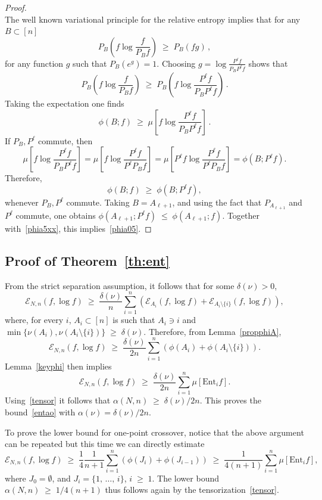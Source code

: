 \documentclass[AHL,Unicode,longabstracts,published]{cedram}
\renewcommand{\leq}{\;\leqslant\;}
\renewcommand{\geq}{\;\geqslant\;}
\newcommand{\ent}{\mathrm{Ent}}
\newcommand{\cE}{\mathcal{E}}
\let\a=\alpha
\let\d=\delta
\begin{document}
\begin{proof}
\begin{equation}
\end{equation}
The well known variational principle for the relative entropy implies that for any $B\subset [n]$
\[
P_B\left(f\log\frac{f}{P_Bf}\right)\geq P_B(fg)\,,
\]
for any function $g$ such that $P_B(e^g)=1$. Choosing $g= \log\frac{P^\ell f}{P_BP^\ell f}$ shows that
\[
P_B\left(f\log\frac{f}{P_Bf}\right)\geq P_B\left(f\log\frac{P^\ell f}{P_BP^\ell f}\right)\,.
\]
Taking the expectation one finds
\[
\phi(B;f)\geq\mu\left[f\log\frac{P^\ell f}{P_BP^\ell f}
\right]\,.
\]
If $P_B,P^\ell $ commute, then
\[
\mu\left[f\log\frac{P^\ell f}{P_BP^\ell f}
\right]= \mu\left[f\log\frac{P^\ell f}{P^\ell P_Bf}
\right]=\mu\left[P^\ell f\log\frac{P^\ell f}{P^\ell P_Bf}
\right] = \phi\left(B;P^\ell f\right).
\]
Therefore,
\[
\phi(B;f)\geq\phi\left(B;P^\ell f\right),
\]
whenever $P_B,P^\ell $ commute. Taking $B=A_{\ell+1}$, and using the fact that $P_{A_{\ell+1}}$ and $P^{\ell}$ commute, one obtains $\phi\left(A_{\ell+1};P^\ell f\right)\leq \phi\left(A_{\ell+1}; f\right)$. Together with~\eqref{phia5xx}, this implies~\eqref{phia05}.
\end{proof}


\subsection{Proof of Theorem~\ref{th:ent}}

From the strict separation assumption, it follows that for some $\d(\nu)>0$,
\[
\cE_{N,n}(f,\log f)
\geq \frac{\d(\nu)}n\sum_{i=1}^n\left(\cE_{A_i}(f,\log f)+\cE_{A_i\setminus\{i\}}(f,\log f)\right),
\]
where, for every $i$, $A_i\subset[n]$ is such that $A_i\ni i$ and $\min\{\nu(A_i),\nu(A_i\setminus\{i\})\}\geq \d(\nu)$. Therefore, from Lemma~\ref{propphiA},
\begin{equation}\label{phia5a1}
\cE_{N,n}(f,\log f)
\geq \frac{\d(\nu)}{2n}\sum_{i=1}^n\left(\phi(A_i) +\phi(A_i\setminus\{i\})\right).
\end{equation}
Lemma~\ref{keyphi} then implies
\begin{equation}\label{phia5a2}
\cE_{N,n}(f,\log f)
\geq \frac{\d(\nu)}{2n}\sum_{i=1}^n\mu\left[\ent_i f\right].
\end{equation}
Using~\eqref{tensor} it follows that $\a(N,n)\geq \d(\nu)/{2n}$. This proves the bound~\eqref{entao} with $\a(\nu)=\d(\nu)/{2n}$.

To prove the lower bound for one-point crossover, notice that the above argument can be repeated but this time we can directly estimate
\[
\cE_{N,n}(f,\log f)\geq \frac14\frac1{n+1}\sum_{i=1}^n (\phi(J_i)+\phi(J_{i-1}))\geq
\frac1{4(n+1)}\sum_{i=1}^n\mu\left[\ent_{i}f \right],
\]
where $J_0=\emptyset$, and $J_i=\{1,\,\dots,\,i\}$, $i\geq 1$. The lower bound $\a(N,n)\geq 1/4(n+1)$ thus follows again by the tensorization~\eqref{tensor}.
\end{document}
